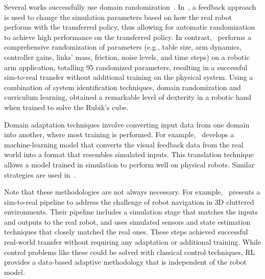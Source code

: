 Several works successfully use domain randomization~\cite{huber2024domain,peng2018sim,akkaya2019solving}. In~\cite{huber2024domain}, a feedback approach is used to change the simulation parameters based on how the real robot performs with the transferred policy, thus allowing for automatic randomization to achieve high performance on the transferred policy. In contrast,~\cite{peng2018sim} performs a comprehensive randomization of parameters (e.g., table size, arm dynamics, controller gains, links' mass, friction, noise levels, and time steps) on a robotic arm application, %
totalling 95 randomized parameters, resulting in a successful sim-to-real transfer without additional training on the physical system. Using a combination of system identification techniques, domain randomization and curriculum learning, \cite{akkaya2019solving} obtained a remarkable level of dexterity in a robotic hand when trained to solve the Rubik's cube.


Domain adaptation techniques involve converting input data from one domain into another, where most training is performed. For example,~\cite{james2019sim} develops a machine-learning model that converts the visual feedback data from the real world into a format that resembles simulated inputs. This translation technique allows a model trained in simulation to perform well on physical robots. Similar strategies are used in~\cite{bousmalis2018using}.

Note that these methodologies are not always necessary. For example,~\cite{hu2021sim} presents a sim-to-real pipeline to address the challenge of robot navigation in 3D cluttered environments. Their pipeline includes a simulation stage that matches the inputs and outputs to the real robot, and uses simulated sensors and state estimation techniques that closely matched the real ones. These steps achieved successful real-world transfer without requiring any adaptation or additional training. While control problems like these could be solved with classical control techniques, RL provides a data-based adaptive methodology that is independent of the robot model.


